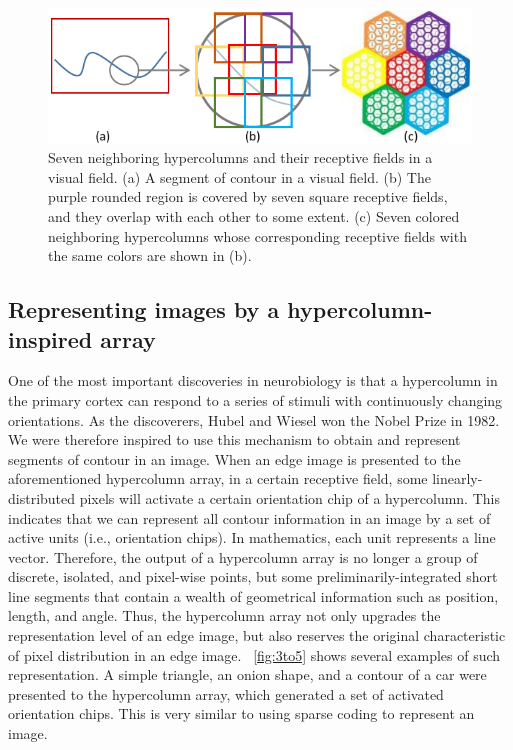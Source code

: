 \documentclass[journal]{IEEEtran}
\begin{document}
\begin{figure}[!t]
\centering
\includegraphics[width=0.8\linewidth]{images/fig2.pdf}
\caption{Seven neighboring hypercolumns and their receptive fields in a visual field. 
(a) A segment of contour in a visual field. 
(b) The purple rounded region is covered by seven square receptive fields, 
and they overlap with each other to some extent. 
(c) Seven colored neighboring hypercolumns whose corresponding receptive fields with the same colors 
are shown in (b).}
\label{fig:2}
\end{figure}

\subsection{Representing images by a hypercolumn-inspired array}

One of the most important discoveries in neurobiology is that a hypercolumn in the primary cortex can respond to a series of stimuli with continuously changing orientations. 
As the discoverers, Hubel and Wiesel won the Nobel Prize in 1982. 
We were therefore inspired to use this mechanism to obtain and represent segments of contour in an image. 
When an edge image is presented to the aforementioned hypercolumn array, 
in a certain receptive field, 
some linearly-distributed pixels will activate a certain orientation chip of a hypercolumn. 
This indicates that we can represent all contour information in an image by a set of active units (i.e., orientation chips). In mathematics, each unit represents a line vector. Therefore, the output of a hypercolumn array is no longer a group of discrete, isolated, and pixel-wise points, 
but some preliminarily-integrated short line segments that contain a wealth of geometrical information such as position, length, and angle. 
Thus, the hypercolumn array not only upgrades the representation level of an edge image, 
but also reserves the original characteristic of pixel distribution in an edge image. 
\figurename~\ref{fig:3to5} shows several examples of such representation.
A simple triangle, an onion shape, and a contour of a car were presented to the hypercolumn array,
which generated a set of activated orientation chips.
This is very similar to using sparse coding to represent an image.
\end{document}
